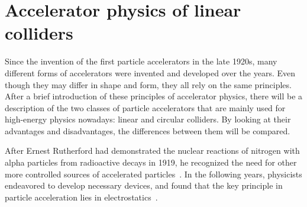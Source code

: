 \chapter{Accelerator physics of linear colliders}
\label{LinearColliderPhysics}

\begin{chapterabstract}
Since the invention of the first particle accelerators in the late 1920s, many different forms of accelerators were invented and developed over the years. 
Even though they may differ in shape and form, they all rely on the same principles. 
After a brief introduction of these principles of accelerator physics, there will be a description of the two classes of particle accelerators that are mainly used for high-energy physics nowadays: linear and circular colliders. 
By looking at their advantages and disadvantages, the differences between them will be compared.
\end{chapterabstract}
\newline

After Ernest Rutherford had demonstrated the nuclear reactions of nitrogen with alpha particles from radioactive decays in 1919, he recognized the need for other more controlled sources of accelerated particles~\cite{Rutherford}.
In the following years, physicists endeavored to develop necessary devices, and found that the key principle in particle acceleration lies in electrostatics~\cite[p. 3f]{Livingston}.

